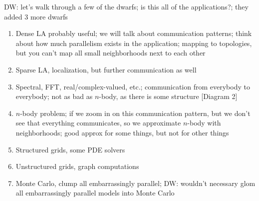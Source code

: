 DW: let's walk through a few of the dwarfs; is this all of the applications?; they added 3 more dwarfs
\begin{enumerate}
    \item Dense LA probably useful; we will talk about communication patterns; think about how much parallelism exists in the application; mapping to topologies, but you can't map all small neighborhoods next to each other
    \item Sparse LA, localization, but further communication as well
    \item Spectral, FFT, real/complex-valued, etc.; communication from everybody to everybody; not as bad as \( n \)-body, as there is some structure [Diagram 2]
    \item \( n \)-body problem; if we zoom in on this communication pattern, but we don't see that everything communicates, so we approximate \( n \)-body with neighborhoods; good approx for some things, but not for other things
    \item Structured grids, some PDE solvers
    \item Unstructured grids, graph computations
    \item Monte Carlo, clump all embarrassingly parallel; DW: wouldn't necessary glom all embarrassingly parallel models into Monte Carlo
\end{enumerate}


